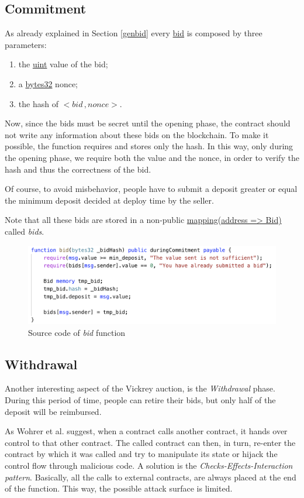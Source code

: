 \documentclass[runningheads,a4paper]{llncs}
\begin{document}
\subsection{Commitment}
As already explained in Section \ref{genbid} every \url{bid} is composed by three parameters:
\begin{enumerate}
\item the \url{uint} value of the bid;
\item a \url{bytes32} nonce;
\item the hash of \(<bid \, , nonce>\).
\end{enumerate}
Now, since the bids must be secret until the opening phase, the contract should not write any information about these bids on the blockchain. To make it possible, the function requires and stores only the hash. In this way, only during the opening phase, we require both the value and the nonce, in order to verify the hash and thus the correctness of the bid. 

Of course, to avoid misbehavior, people have to submit a deposit greater or equal the minimum deposit decided at deploy time by the seller.

Note that all these bids are stored in a non-public \url{mapping(address => Bid)} called \emph{bids}.

\begin{figure}[h]
\includegraphics[width=\linewidth]{images/bid.png}
\centering
\caption{Source code of \emph{bid} function}
\label{fig:vickreyBid}
\end{figure}


\newpage
\subsection{Withdrawal}
Another interesting aspect of the Vickrey auction, is the \emph{Withdrawal} phase. During this period of time, people can retire their bids, but only half of the deposit will be reimbursed. 

As Wohrer et al. \cite{soliditypattern} suggest, when a contract calls another contract,  it  hands  over  control  to  that other  contract.  The  called  contract  can then, in turn, re-enter the contract by which it was called and try to manipulate its state or hijack the control flow through malicious code. A solution is the \emph{Checks-Effects-Interaction pattern}. Basically, all the calls to external contracts, are always placed at the end of the function. This way, the possible attack surface is limited. 
\end{document}
